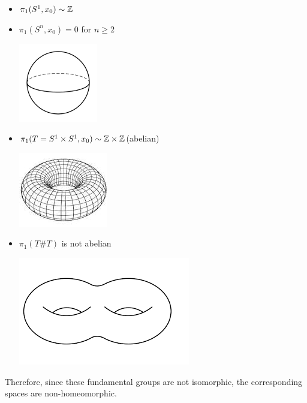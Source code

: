 \documentclass[letterpaper,12pt,fleqn]{article}
\begin{document}
\begin{itemize}
\item \(\pi_1(S^1,x_0)\sim\mathbb{Z}\)

  \begin{center}
  \end{center}

\item \(\pi_1(S^n,x_0)=0\) for \(n\ge2\)

  \begin{center}
    \includegraphics[scale=0.25]{sphere}
  \end{center}

\item \(\pi_1(T=S^1\times S^1,x_0)\sim\mathbb{Z}\times\mathbb{Z}\)\qquad(abelian)

  \begin{center}
    \includegraphics[scale=0.25]{torus}
  \end{center}

\item \(\pi_1(T\#T)\) is not abelian

  \begin{center}
    \includegraphics[scale=0.25]{dtorus}
  \end{center}
\end{itemize}

Therefore, since these fundamental groups are not isomorphic, the corresponding spaces are non-homeomorphic.

\newpage

\nocite{*}


\end{document}
